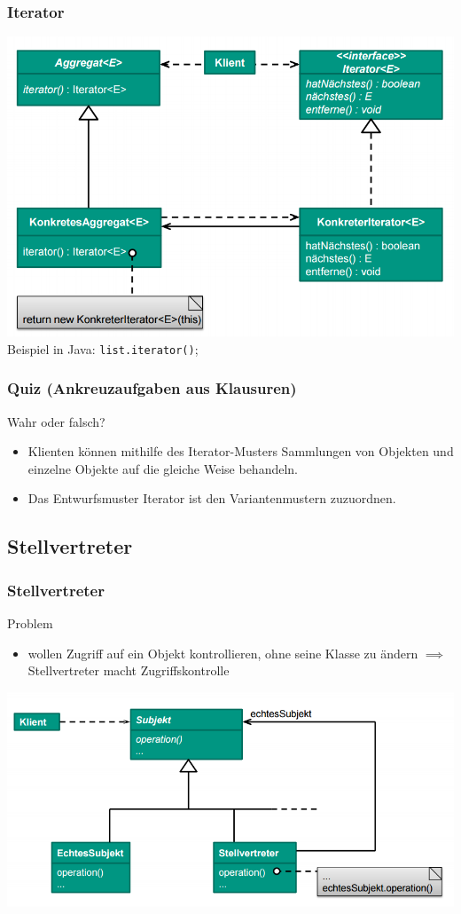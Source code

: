 \documentclass[18pt]{beamer}
\newcommand{\xmark}{\ding{55}}%
\newcommand{\ncorrect}{\textcolor{red}{\xmark}}
\begin{document}
	\begin{frame}
		\frametitle{Iterator}
		\centering
		\includegraphics[scale=0.35]{./pics/tut3/iter.png}
		\linebreak Beispiel in Java: \texttt{list.iterator()};
	\end{frame}

	\begin{frame}
		\frametitle{Quiz (Ankreuzaufgaben aus Klausuren)}
		Wahr oder falsch?
		\begin{itemize}
			\item Klienten können mithilfe des Iterator-Musters Sammlungen von Objekten und einzelne Objekte auf die gleiche Weise behandeln. \pause \ncorrect \pause
			\item Das Entwurfsmuster Iterator ist den Variantenmustern zuzuordnen. \pause \ncorrect
		\end{itemize}
	\end{frame}

	\subsection{Stellvertreter}
	\begin{frame}
		\frametitle{Stellvertreter}
		\begin{block}{Problem}
			\begin{itemize}
				\item wollen Zugriff auf ein Objekt kontrollieren, ohne seine Klasse zu ändern \linebreak \pause $\implies$ Stellvertreter macht Zugriffskontrolle
			\end{itemize}
		\end{block}
		\pause
		\centering
		\includegraphics[scale=0.4]{./pics/tut3/prox.png}
	\end{frame}
\end{document}
